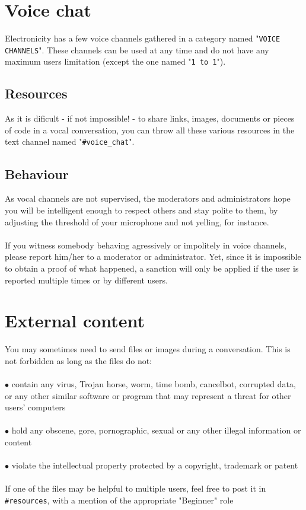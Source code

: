 \documentclass[a4paper]{article}
\begin{document}
\pagebreak

\section{Voice chat}
Electronicity has a few voice channels gathered in a category named "\texttt{VOICE CHANNELS}". These channels can be used at any time and do not have any maximum users limitation (except the one named "\texttt{1 to 1}").

\subsection{Resources}
As it is dificult - if not impossible! - to share links, images, documents or pieces of code in a vocal conversation, you can throw all these various resources in the text channel named "\texttt{\#voice\_chat}".

\subsection{Behaviour}
As vocal channels are not supervised, the moderators and administrators hope you will be intelligent enough to respect others and stay polite to them, by adjusting the threshold of your microphone and not yelling, for instance.\\\\
If you witness somebody behaving agressively or impolitely in voice channels, please report him/her to a moderator or administrator. Yet, since it is impossible to obtain a proof of what happened, a sanction will only be applied if the user is reported multiple times or by different users.
\pagebreak

\section{External content}
You may sometimes need to send files or images during a conversation. This is not forbidden as long as the files do not:\\\\
$\bullet$ contain any virus, Trojan horse, worm, time bomb, cancelbot, corrupted data, or any other similar software or program that may represent a threat for other users' computers\\\\
$\bullet$ hold any obscene, gore, pornographic, sexual or any other illegal information or content\\\\
$\bullet$ violate the intellectual property protected by a copyright, trademark or patent\\\\
If one of the files may be helpful to multiple users, feel free to post it in \texttt{\#resources}, with a mention of the appropriate "Beginner" role
\pagebreak
\end{document}
